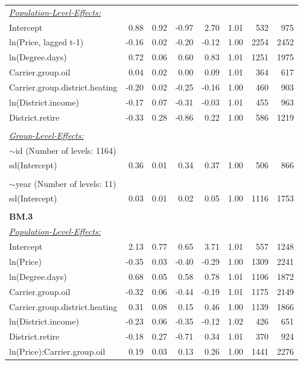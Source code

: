 \documentclass[12pt,twoside]{reedthesis}
\begin{document}
\begin{longtable}[c]{lrrrrrrr}
{\ul \textit{Population-Level-Effects:}} &  &  &  &  &  &  &  \\
Intercept & 0.88 & 0.92 & -0.97 & 2.70 & 1.01 & 532 & 975 \\
ln(Price, lagged t-1) & -0.16 & 0.02 & -0.20 & -0.12 & 1.00 & 2254 & 2452 \\
ln(Degree.days) & 0.72 & 0.06 & 0.60 & 0.83 & 1.01 & 1251 & 1975 \\
Carrier.group.oil & 0.04 & 0.02 & 0.00 & 0.09 & 1.01 & 364 & 617 \\
Carrier.group.district.heating & -0.20 & 0.02 & -0.25 & -0.16 & 1.00 & 460 & 903 \\
ln(District.income) & -0.17 & 0.07 & -0.31 & -0.03 & 1.01 & 455 & 963 \\
District.retire & -0.33 & 0.28 & -0.86 & 0.22 & 1.00 & 586 & 1219 \\
 &  &  &  &  &  &  &  \\
{\ul \textit{Group-Level-Effects:}} &  &  &  &  &  &  &  \\
$\sim$id (Number of levels: 1164) &  &  &  &  &  &  &  \\
sd(Intercept) & 0.36 & 0.01 & 0.34 & 0.37 & 1.00 & 506 & 866 \\
 &  &  &  &  &  &  &  \\
$\sim$year (Number of levels: 11) &  &  &  &  &  &  &  \\
sd(Intercept) & 0.03 & 0.01 & 0.02 & 0.05 & 1.00 & 1116 & 1753 \\ \hline
 &  &  &  &  &  &  &  \\ \hline
\textbf{BM.3} &  &  &  &  &  &  &  \\
{\ul \textit{Population-Level-Effects:}} &  &  &  &  &  &  &  \\
Intercept & 2.13 & 0.77 & 0.65 & 3.71 & 1.01 & 557 & 1248 \\
ln(Price) & -0.35 & 0.03 & -0.40 & -0.29 & 1.00 & 1309 & 2241 \\
ln(Degree.days) & 0.68 & 0.05 & 0.58 & 0.78 & 1.01 & 1106 & 1872 \\
Carrier.group.oil & -0.32 & 0.06 & -0.44 & -0.19 & 1.01 & 1175 & 2149 \\
Carrier.group.district.heating & 0.31 & 0.08 & 0.15 & 0.46 & 1.00 & 1139 & 1866 \\
ln(District.income) & -0.23 & 0.06 & -0.35 & -0.12 & 1.02 & 426 & 651 \\
District.retire & -0.18 & 0.27 & -0.71 & 0.34 & 1.01 & 370 & 924 \\
ln(Price):Carrier.group.oil & 0.19 & 0.03 & 0.13 & 0.26 & 1.00 & 1441 & 2276 \\

\end{longtable}
\end{document}
